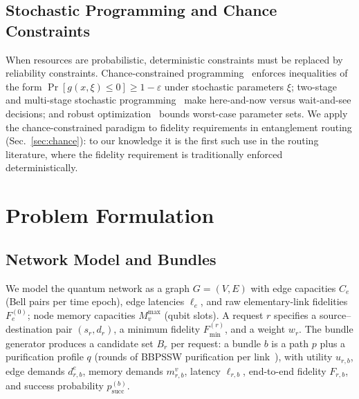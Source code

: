 \documentclass[twocolumn]{article}
\begin{document}
\subsection{Stochastic Programming and Chance Constraints}
\label{sec:related-chance}

When resources are probabilistic, deterministic constraints must be
replaced by reliability constraints.  Chance-constrained
programming~\cite{charnes1959chance,prekopa1995stochastic} enforces
inequalities of the form $\Pr[g(x,\xi) \le 0] \ge 1-\varepsilon$ under
stochastic parameters $\xi$; two-stage and multi-stage stochastic
programming~\cite{birge1997introduction} make here-and-now versus
wait-and-see decisions; and robust optimization~\cite{bertsimas2004price,
ben-tal2009robust} bounds worst-case parameter sets.  We apply the
chance-constrained paradigm to fidelity requirements in entanglement
routing (Sec.~\ref{sec:chance}): to our knowledge it is the first such
use in the routing literature, where the fidelity requirement is
traditionally enforced deterministically.

\section{Problem Formulation}
\label{sec:qubo}

\subsection{Network Model and Bundles}
\label{sec:model}

We model the quantum network as a graph $G=(V,E)$ with edge
capacities $C_e$ (Bell pairs per time epoch), edge latencies
$\ell_e$, and raw elementary-link fidelities $F_e^{(0)}$; node
memory capacities $M_v^{\max}$ (qubit slots).  A request $r$ specifies
a source--destination pair $(s_r,d_r)$, a minimum fidelity
$F_{\min}^{(r)}$, and a weight $w_r$.  The bundle generator produces a
candidate set $B_r$ per request: a bundle $b$ is a path $p$ plus a
purification profile $q$ (rounds of BBPSSW purification per
link~\cite{bennett1996purification}), with utility
$u_{r,b}$, edge demands $d_{r,b}^e$, memory demands $m_{r,b}^v$,
latency $\ell_{r,b}$, end-to-end fidelity $F_{r,b}$, and success
probability $p_{\text{succ}}^{(b)}$.
\end{document}
